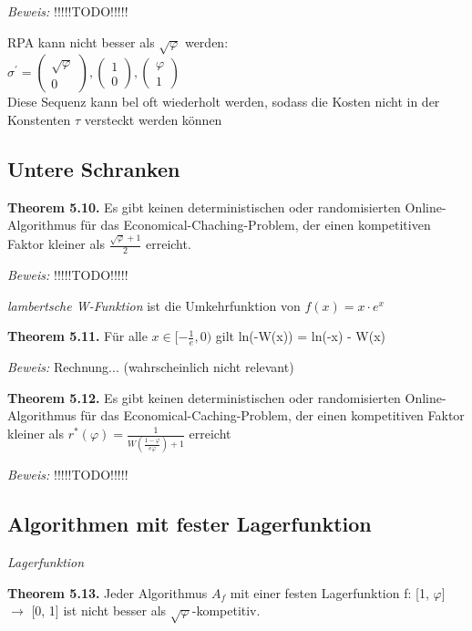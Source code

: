 \textit{Beweis:} !!!!!TODO!!!!!

RPA kann nicht besser als $\sqrt{\varphi}$ werden: \\
$\sigma^{'} = \left(\begin{array}{c} \sqrt{\varphi} \\ 0 \end{array}\right), \left(\begin{array}{c} 1 \\ 0 \end{array}\right), \left(\begin{array}{c} \varphi \\ 1 \end{array}\right)$ \\
Diese Sequenz kann bel oft wiederholt werden, sodass die Kosten nicht in der Konstenten $\tau$ versteckt werden können

\subsection{Untere Schranken}

\textbf{Theorem 5.10.} Es gibt keinen deterministischen oder randomisierten Online-Algorithmus für das Economical-Chaching-Problem, der einen kompetitiven Faktor kleiner als $\tfrac{\sqrt{\varphi} +1}{2}$ erreicht.

\textit{Beweis:} !!!!!TODO!!!!!

\textit{lambertsche W-Funktion} ist die Umkehrfunktion von $f(x) = x \cdot e^{x}$

\textbf{Theorem 5.11.} Für alle $x \in [-\tfrac{1}{e}, 0)$ gilt ln(-W(x)) = ln(-x) - W(x)

\textit{Beweis:} Rechnung... (wahrscheinlich nicht relevant)

\textbf{Theorem 5.12.} Es gibt keinen deterministischen oder randomisierten Online-Algorithmus für das Economical-Caching-Problem, der einen kompetitiven Faktor kleiner als $r^{*}(\varphi) = \tfrac{1}{W(\tfrac{1-\varphi}{e\varphi})+1}$ erreicht

\textit{Beweis:} !!!!!TODO!!!!!

\subsection{Algorithmen mit fester Lagerfunktion}

\textit{Lagerfunktion} 

\textbf{Theorem 5.13.} Jeder Algorithmus $A_{f}$ mit einer festen Lagerfunktion f: [1, $\varphi$] $\to$ [0, 1] ist nicht besser als $\sqrt{\varphi}$-kompetitiv.

